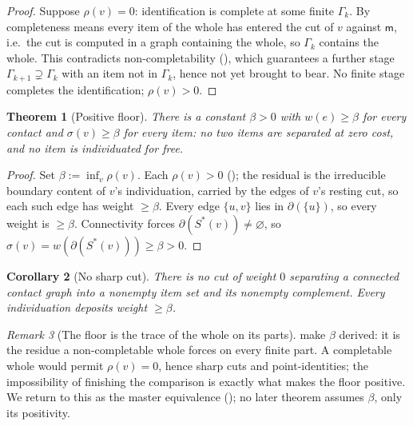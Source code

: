\documentclass[twocolumn,11pt,a4paper]{article}
\theoremstyle{sup}
\newtheorem{theorem}{Theorem}[section]
\newtheorem{corollary}[theorem]{Corollary}
\theoremstyle{definition}
\theoremstyle{remark}
\newtheorem{remark}[theorem]{Remark}
\newcommand{\Gph}{\Gamma}
\newcommand{\wt}{w}
\newcommand{\med}{\mathsf{m}}
\newcommand{\flo}{\beta}
\newcommand{\cut}{\partial}
\newcommand{\str}{\sigma}
\newcommand{\res}{\rho}
\begin{document}
\begin{proof}
Suppose $\res(v)=0$: identification is complete at some finite $\Gph_k$. By
 completeness means every item of the whole has entered the
cut of $v$ against $\med$, i.e.\ the cut is computed in a graph containing the
whole, so $\Gph_k$ contains the whole. This contradicts non-completability
(), which guarantees a further stage
$\Gph_{k+1}\supsetneq\Gph_k$ with an item not in $\Gph_k$, hence not yet brought
to bear. No finite stage completes the identification; $\res(v)>0$.
\end{proof}

\begin{theorem}[Positive floor]
\label{thm:floor}
There is a constant $\flo>0$ with $\wt(e)\ge\flo$ for every contact and
$\str(v)\ge\flo$ for every item: no two items are separated at zero cost, and no
item is individuated for free.
\end{theorem}

\begin{proof}
Set $\flo:=\inf_v\res(v)$. Each $\res(v)>0$ (); the
residual is the irreducible boundary content of $v$'s individuation, carried by
the edges of $v$'s resting cut, so each such edge has weight $\ge\flo$. Every
edge $\{u,v\}$ lies in $\cut(\{u\})$, so every weight is $\ge\flo$. Connectivity
forces $\cut(S^\ast(v))\neq\varnothing$, so
$\str(v)=\wt(\cut(S^\ast(v)))\ge\flo>0$.
\end{proof}

\begin{corollary}[No sharp cut]
\label{cor:no-sharp}
There is no cut of weight $0$ separating a connected contact graph into a
nonempty item set and its nonempty complement. Every individuation deposits
weight $\ge\flo$.
\end{corollary}

\begin{remark}[The floor is the trace of the whole on its parts]
\label{rem:trace}
 make $\flo$ derived: it is the residue a
non-completable whole forces on every finite part. A completable whole would
permit $\res(v)=0$, hence sharp cuts and point-identities; the impossibility of
finishing the comparison is exactly what makes the floor positive. We return to
this as the master equivalence (); no later theorem assumes
$\flo$, only its positivity.
\end{remark}
\end{document}
